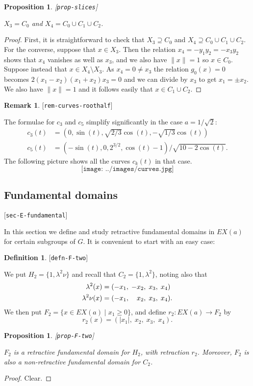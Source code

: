 \documentclass[reqno]{amsart}
\newcommand{\lbl}[1]{\label{#1}\textup{[\texttt{#1}]}\par}
\newcommand{\lbl}{\label}
\newcommand{\lm}        {\lambda}
\newcommand{\st}        {\;|\;}
\newcommand{\sm}        {\setminus}
\newcommand{\rt}        {\sqrt{2}}
\newcommand{\pp}        {\hphantom{+}}
\renewcommand{\:}{\colon}
\newtheorem{proposition}[theorem]{Proposition}
\theoremstyle{definition}
\newtheorem{remark}[theorem]{Remark}
\newtheorem{definition}[theorem]{Definition}
\begin{document}
\begin{proposition}\lbl{prop-slices}
 $X_3=C_0$ and $X_4=C_0\cup C_1\cup C_2$.
\end{proposition}
\begin{proof}
 First, it is straightforward to check that $X_3\supseteq C_0$ and
 $X_4\supseteq C_0\cup C_1\cup C_2$.  For the converse, suppose that
 $x\in X_3$.  Then the relation $x_4=-y_1y_2=-x_3y_2$ shows that
 $x_4$ vanishes as well as $x_3$, and we also have $\|x\|=1$ so
 $x\in C_0$.  Suppose instead that $x\in X_4\sm X_3$.  As
 $x_4=0\neq x_3$ the relation $g_0(x)=0$ becomes
 $2(x_1-x_2)(x_1+x_2)x_3=0$ and we can divide by $x_3$ to get
 $x_1=\pm x_2$.  We also have $\|x\|=1$ and it follows easily that
 $x\in C_1\cup C_2$.
\end{proof}

\begin{remark}\lbl{rem-curves-roothalf}
 The formulae for $c_3$ and $c_5$ simplify significantly in the case $a=1/\rt$:
 \begin{align*}
  c_3(t) &= \left(0,\sin(t),\sqrt{2/3}\cos(t),-\sqrt{1/3}\cos(t)\right) \\
  c_5(t) &= \left(-\sin(t),0,2^{3/2},\cos(t)-1\right)/\sqrt{10-2\cos(t)}.
 \end{align*}
 The following picture shows all the curves $c_k(t)$ in that case.
 \[ \texttt{[image: ../images/curves.jpg]}
 \]
\end{remark}

\subsection{Fundamental domains}
\lbl{sec-E-fundamental}

In this section we define and study retractive fundamental domains in
$EX(a)$ for certain subgroups of $G$.  It is convenient to start with
an easy case:
\begin{definition}\lbl{defn-F-two}
 We put $H_2=\{1,\lm^2\nu\}$ and recall that $C_2=\{1,\lm^2\}$, noting
 also that
 \begin{align*}
  \lm^2(x)    &= (-x_1,\;-x_2,\;x_3,\;x_4) \\
  \lm^2\nu(x) &= (-x_1,\;\pp x_2,\;x_3,\;x_4).
 \end{align*}
 We then put $F_2=\{x\in EX(a)\st x_1\geq 0\}$, and define
 $r_2\:EX(a)\to F_2$ by
 \[ r_2(x) = (|x_1|,\;x_2,\;x_3,\;x_4). \]
\end{definition}
\begin{proposition}\lbl{prop-F-two}
 $F_2$ is a retractive fundamental domain for $H_2$, with retraction
 $r_2$.  Moreover, $F_2$ is also a non-retractive fundamental domain
 for $C_2$.
\end{proposition}
\begin{proof}
 Clear.
\end{proof}
\end{document}
